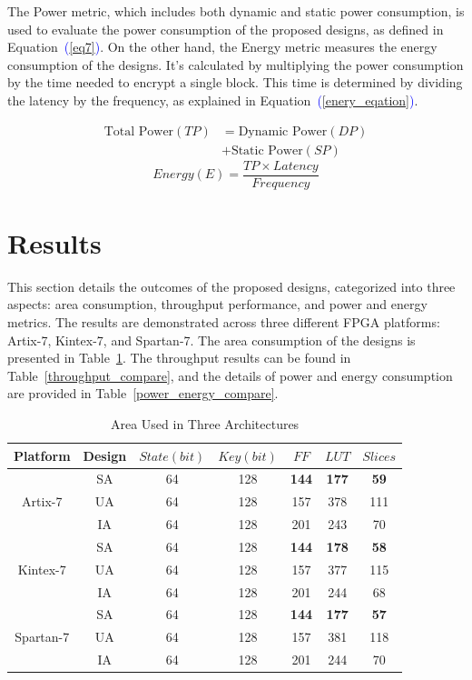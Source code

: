 \documentclass[final,5p,times,twocolumn]{elsarticle}
\begin{document}
The Power metric, which includes both dynamic and static power consumption, is used to evaluate the power consumption of the proposed designs, as defined in Equation~\textcolor{blue}{(\ref{eq7})}.
On the other hand, the Energy metric measures the energy consumption of the designs. It's calculated by multiplying the power consumption by the time needed to encrypt a single block. This time is determined by dividing the latency by the frequency, as explained in Equation~\textcolor{blue}{(\ref{enery_eqation})}.

\begin{align}
    \text{Total Power} (TP) & = \text{Dynamic Power} (DP) \nonumber \\
                            & + \text{Static Power} (SP)
    \label{eq7}
\end{align}
\begin{equation}
    Energy(E) = \frac{TP \times Latency }{Frequency}
    \label{enery_eqation}
\end{equation}


\section{Results}\label{sec5}

This section details the outcomes of the proposed designs, categorized into three aspects: area consumption, throughput performance, and power and energy metrics.
The results are demonstrated across three different FPGA platforms: Artix-7, Kintex-7, and Spartan-7.
The area consumption of the designs is presented in Table~\ref{area_compare}. The throughput results can be found in Table~\ref{throughput_compare}, and the details of power and energy consumption are provided in Table~\ref{power_energy_compare}.


\begin{table}[h]
    \caption{Area Used in Three Architectures}\label{area_compare}%
    \begin{tabular*}{\textwidth}{@{\extracolsep\fill}|c|c|c|c|c|c|c|}
        \hline
        Platform & Design & $State(bit)$ & $Key(bit)$ & $FF$ & $LUT$ & $Slices$ \\
        \hline
        \multirow{3}{*}{Artix-7}  & SA & 64 & 128 & \textbf{144} & \textbf{177} & \textbf{59} \\
        & UA & 64 & 128 & 157 & 378 & 111 \\
        & IA & 64 & 128 & 201 & 243 & 70 \\
        \hline
        \multirow{3}{*}{Kintex-7} & SA & 64 & 128 & \textbf{144} & \textbf{178} & \textbf{58}\\
        & UA & 64 & 128 & 157 & 377 & 115 \\
        & IA & 64 & 128 & 201 & 244 & 68 \\
        \hline
        \multirow{3}{*}{Spartan-7} & SA & 64 & 128 & \textbf{144} & \textbf{177} & \textbf{57}\\
        & UA & 64 & 128 & 157 & 381 & 118 \\
        & IA & 64 & 128 & 201 & 244 & 70 \\
        \hline
    \end{tabular*}
\end{table}
\end{document}
